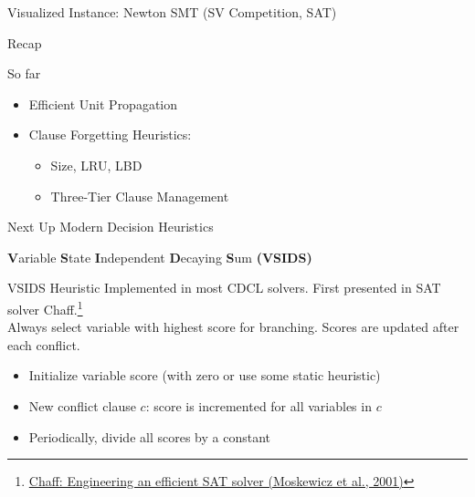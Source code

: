 \documentclass[t]{sdqbeamer}
\begin{document}
\begin{frame}{Visualized Instance: Newton SMT (SV Competition, SAT)}
{}
\end{frame}

\begin{frame}{Recap}
\begin{block}{So far}
\begin{itemize}\setlength{\itemsep}{1em}
    \item Efficient Unit Propagation
    \item Clause Forgetting Heuristics:
    \begin{itemize}\setlength{\itemsep}{1ex}
        \item Size, LRU, LBD
        \item Three-Tier Clause Management
    \end{itemize}
\end{itemize}
\end{block}
\begin{block}{Next Up}
Modern Decision Heuristics
\end{block}
\end{frame}

    
\begin{frame}{{\bf V}ariable {\bf S}tate {\bf I}ndependent {\bf D}ecaying {\bf S}um {\bf (VSIDS)}}
\begin{block}{VSIDS Heuristic}
    Implemented in most CDCL solvers. First presented in SAT solver Chaff.\footnote{\href{https://doi.org/10.1145/378239.379017}{Chaff: Engineering an efficient SAT solver (Moskewicz et al., 2001)}}\\[1em]
    Always select variable with highest score for branching. Scores are updated after each conflict.\\[1em]
    \begin{itemize}\setlength{\itemsep}{1em}
        \item Initialize variable score (with zero or use some static heuristic)
        \item New conflict clause $c$: score is incremented for all variables in $c$
        \item Periodically, divide all scores by a constant
    \end{itemize}	
\end{block}
\end{frame}
    
\end{document}
